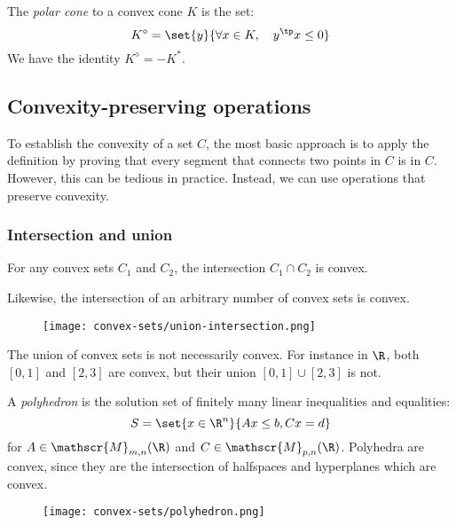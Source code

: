 \begin{definition}
    The \emph{polar cone} to a convex cone $K$ is the set:
    \begin{equation*}
        K^\diamond = \set{y}{\forall x\in K,\quad y^\tp x\leq 0}
    \end{equation*}
    We have the identity $K^\diamond = -K^*$.
\end{definition}

\subsection{Convexity-preserving operations}
To establish the convexity of a set $C$, the most basic approach is to apply the definition by proving that every segment that connects two points in $C$ is in $C$. However, this can be tedious in practice. Instead, we can use operations that preserve convexity.

\subsubsection{Intersection and union}
\begin{property}
    For any convex sets $C_1$ and $C_2$, the intersection $C_1\cap C_2$ is convex.
\end{property}
Likewise, the intersection of an arbitrary number of convex sets is convex.

\begin{figure}[H]
    \centering
    \texttt{[image: convex-sets/union-intersection.png]}
\end{figure}

\begin{remark}
    The union of convex sets is not necessarily convex. For instance in $\R$, both $[0, 1]$ and $[2, 3]$ are convex, but their union $[0, 1]\cup[2, 3]$ is not.
\end{remark}

\begin{definition}[Polyhedron]
    A \emph{polyhedron} is the solution set of finitely many linear inequalities and equalities:
    \begin{equation*}
        S = \set{x\in\R^n}{Ax\leq b, Cx=d}
    \end{equation*}
    for $A\in\mathscr{M}_{m,n}(\R)$ and $C\in\mathscr{M}_{p,n}(\R)$. Polyhedra are convex, since they are the intersection of halfspaces and hyperplanes which are convex.
\end{definition}
\begin{figure}[H]
    \centering
    \texttt{[image: convex-sets/polyhedron.png]}
\end{figure}

